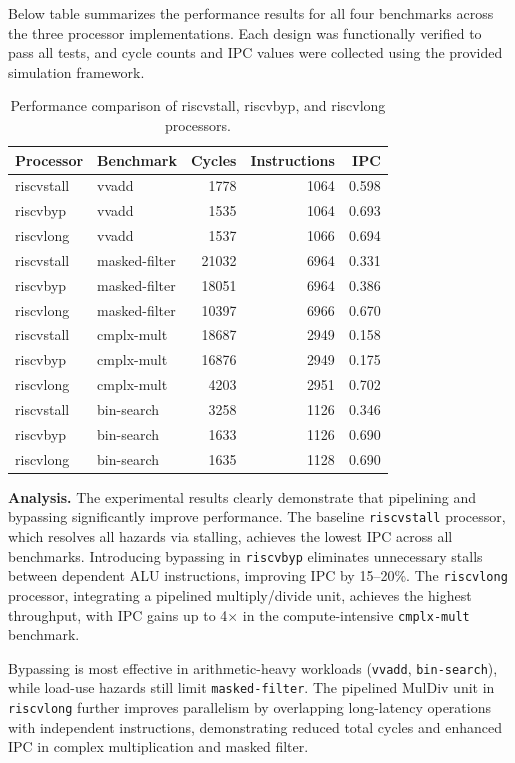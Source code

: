 \documentclass[11pt,a4paper]{article}
\begin{document}
Below table summarizes the performance results for all four benchmarks across the three processor implementations. Each design was functionally verified to pass all tests, and cycle counts and IPC values were collected using the provided simulation framework.

\begin{table}[h!]
\centering
\caption{Performance comparison of riscvstall, riscvbyp, and riscvlong processors.}
\label{tab:lab2-eval}
\begin{tabular}{l|l|r|r|r}
\hline
\textbf{Processor} & \textbf{Benchmark} & \textbf{Cycles} & \textbf{Instructions} & \textbf{IPC} \\ \hline
riscvstall & vvadd & 1778 & 1064 & 0.598 \\
riscvbyp   & vvadd & 1535 & 1064 & 0.693 \\
riscvlong  & vvadd & 1537 & 1066 & 0.694 \\ \hline
riscvstall & masked-filter & 21032 & 6964 & 0.331 \\
riscvbyp   & masked-filter & 18051 & 6964 & 0.386 \\
riscvlong  & masked-filter & 10397 & 6966 & 0.670 \\ \hline
riscvstall & cmplx-mult & 18687 & 2949 & 0.158 \\
riscvbyp   & cmplx-mult & 16876 & 2949 & 0.175 \\
riscvlong  & cmplx-mult & 4203  & 2951 & 0.702 \\ \hline
riscvstall & bin-search & 3258  & 1126 & 0.346 \\
riscvbyp   & bin-search & 1633  & 1126 & 0.690 \\
riscvlong  & bin-search & 1635  & 1128 & 0.690 \\ \hline
\end{tabular}
\end{table}

\noindent
\textbf{Analysis.} The experimental results clearly demonstrate that pipelining and bypassing significantly improve performance. The baseline \texttt{riscvstall} processor, which resolves all hazards via stalling, achieves the lowest IPC across all benchmarks. Introducing bypassing in \texttt{riscvbyp} eliminates unnecessary stalls between dependent ALU instructions, improving IPC by 15--20\%. The \texttt{riscvlong} processor, integrating a pipelined multiply/divide unit, achieves the highest throughput, with IPC gains up to 4$\times$ in the compute-intensive \texttt{cmplx-mult} benchmark.

Bypassing is most effective in arithmetic-heavy workloads (\texttt{vvadd}, \texttt{bin-search}), while load-use hazards still limit \texttt{masked-filter}. The pipelined MulDiv unit in \texttt{riscvlong} further improves parallelism by overlapping long-latency operations with independent instructions, demonstrating reduced total cycles and enhanced IPC in complex multiplication and masked filter.
\end{document}
